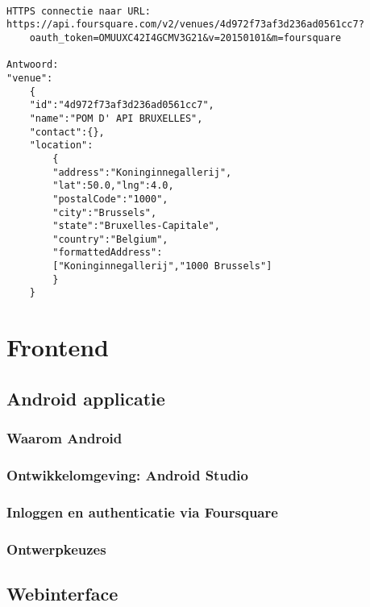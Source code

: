 \begin{lstlisting}[caption={Voorbeeld: werking Foursquare API},label=lst:vb_foursquare_api]

HTTPS connectie naar URL:
https://api.foursquare.com/v2/venues/4d972f73af3d236ad0561cc7?
	oauth_token=OMUUXC42I4GCMV3G21&v=20150101&m=foursquare

Antwoord:
"venue":
	{
	"id":"4d972f73af3d236ad0561cc7",
	"name":"POM D' API BRUXELLES",
	"contact":{},
	"location":
		{
		"address":"Koninginnegallerij",
		"lat":50.0,"lng":4.0,
		"postalCode":"1000",
		"city":"Brussels",
		"state":"Bruxelles-Capitale",
		"country":"Belgium",
		"formattedAddress":
		["Koninginnegallerij","1000 Brussels"]
		}
	}
\end{lstlisting}
 


\section{Frontend}
\subsection{Android applicatie}
\subsubsection{Waarom Android}
% 
\subsubsection{Ontwikkelomgeving: Android Studio}
\subsubsection{Inloggen en authenticatie via Foursquare}

\subsubsection{Ontwerpkeuzes}

\subsection{Webinterface}
\label{Webinterface}
